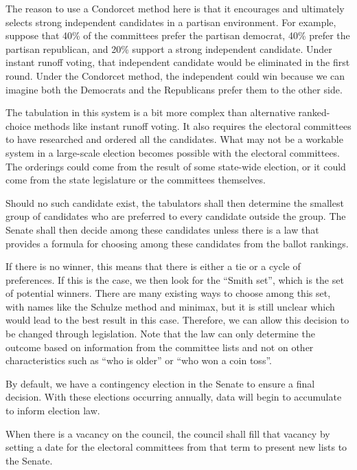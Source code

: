 \documentclass{article}
\begin{document}
The reason to use a Condorcet method here is that it encourages and ultimately selects strong independent candidates in a partisan environment. For example, suppose that 40\% of the committees prefer the partisan democrat, 40\% prefer the partisan republican, and 20\% support a strong independent candidate. Under instant runoff voting, that independent candidate would be eliminated in the first round. Under the Condorcet method, the independent could win because we can imagine both the Democrats and the Republicans prefer them to the other side.

The tabulation in this system is a bit more complex than alternative ranked-choice methods like instant runoff voting. It also requires the electoral committees to have researched and ordered all the candidates. What may not be a workable system in a large-scale election becomes possible with the electoral committees. The orderings could come from the result of some state-wide election, or it could come from the state legislature or the committees themselves.

\begin{quoting}
Should no such candidate exist, the tabulators shall then determine the smallest group of candidates who are preferred to every candidate outside the group. The Senate shall then decide among these candidates unless there is a law that provides a formula for choosing among these candidates from the ballot rankings.
\end{quoting}

If there is no winner, this means that there is either a tie or a cycle of preferences. If this is the case, we then look for the “Smith set”\cite{Smith_Set}, which is the set of potential winners. There are many existing ways to choose among this set, with names like the Schulze method\cite{Schulze} and minimax, but it is still unclear which would lead to the best result in this case. Therefore, we can allow this decision to be changed through legislation. Note that the law can only determine the outcome based on information from the committee lists and not on other characteristics such as “who is older” or “who won a coin toss”.

By default, we have a contingency election in the Senate to ensure a final decision. With these elections occurring annually, data will begin to accumulate to inform election law.

\begin{quoting}
When there is a vacancy on the council, the council shall fill that vacancy by setting a date for the electoral committees from that term to present new lists to the Senate.
\end{quoting}
\end{document}
